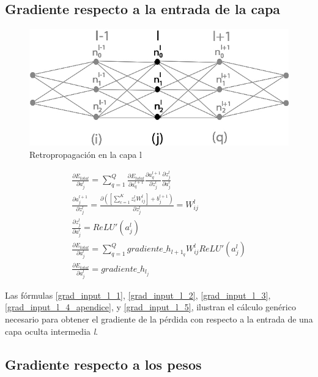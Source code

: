 \subsection{Gradiente respecto a la entrada de la capa}

\begin{figure}[H]
	\centering
	\includegraphics[scale=0.35]{imagenes/conclusion_capa_l.jpg}  
	\caption{Retropropagación en la capa l}
	\label{fig:conclusion_capa_l_apendice}
\end{figure}

\begin{gather}
	\frac{\partial E_{total}}{\partial a^l_j} = \sum_{q=1}^Q \frac{\partial E_{total}}{\partial a^{l+1}_q}   \frac{\partial a^{l+1}_q}{\partial z^l_j}   \frac{\partial z^l_j}{\partial a^l_j} \label{grad_input_l_1} \\
	\frac{\partial a^{l+1}_j }{\partial z^l_j } = \frac{\partial ([\sum_{c=1}^{K} z^l_c   W^l_{ij}] + b^{l+1}_j) }{\partial z^l_j } = W^l_{ij} \label{grad_input_l_2} \\
	\frac{\partial z^l_j}{\partial a^l_j} = ReLU'(a^l_j) \label{grad_input_l_3} \\
	\frac{\partial E_{total}}{\partial a^l_j} = \sum_{q=1}^Q  gradiente\_h_{{l+1}_q}   W^l_{ij}   ReLU'(a^l_j) \label{grad_input_l_4_apendice} \\
	\frac{\partial E_{total}}{\partial a^l_j} = gradiente\_h_{l_j} \label{grad_input_l_5}
\end{gather}

Las fórmulas \ref{grad_input_l_1}, \ref{grad_input_l_2}, \ref{grad_input_l_3},  \ref{grad_input_l_4_apendice}, y \ref{grad_input_l_5}, ilustran el cálculo genérico necesario para obtener el gradiente de la pérdida con respecto a la entrada de una capa oculta intermedia \textit{l}.

\subsection{Gradiente respecto a los pesos}

